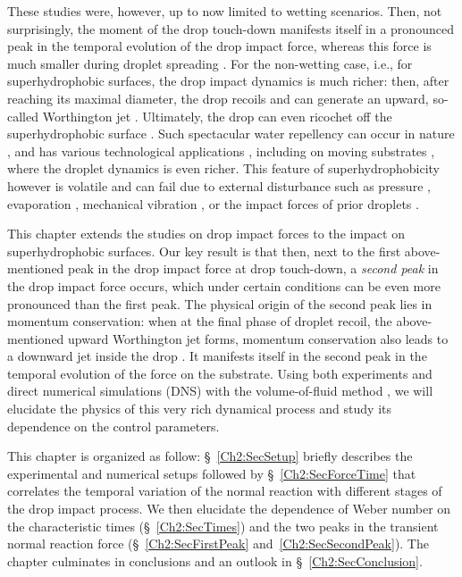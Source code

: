 These studies were, however, up to now limited to wetting scenarios. Then, not surprisingly, the moment of the drop touch-down \cite{wagner1932stoss, philippi2016} manifests itself in a pronounced peak in the temporal evolution of the drop impact force, whereas this force is much smaller during droplet spreading \cite{yarin2006drop, wildeman2016spreading}. For the non-wetting case, i.e., for superhydrophobic surfaces, the drop impact dynamics is much richer: then, after reaching its maximal diameter, the drop recoils \cite{bergeron2001water} and can generate an upward, so-called  Worthington jet \cite{worthington1877xxviii, bartolo2006singular}. Ultimately, the drop can even ricochet off the superhydrophobic surface \cite{richard2002contact}. Such spectacular water repellency can occur  in nature \cite{onda1996super, lafuma2003, callies2005water}, and has various technological applications \cite{tuteja2007, cho2016, liu2017, hao2016, wu2020}, including on moving substrates \cite{zhan2021}, where the droplet dynamics is even richer. This feature of superhydrophobicity however is volatile and can fail due to external disturbance such as pressure \cite{lafuma2003, callies2005water, sbragaglia2007, li2017}, evaporation \cite{tsai2010, chen2012, papadopoulos2013},  mechanical vibration \cite{bormashenko2007}, or the impact forces of prior droplets \cite{bartolo2006bouncing}.   

This chapter extends the studies on drop impact forces to the impact on superhydrophobic surfaces. Our key result is that then, next to the first above-mentioned peak in the drop impact force at drop touch-down, a {\it second peak}  in the drop impact force occurs, which under certain conditions can be even more pronounced than the first peak. The physical origin of the second peak lies in momentum conservation: when at the final phase of droplet recoil, the above-mentioned upward Worthington jet forms, momentum conservation also leads to a downward jet inside the drop \cite{lohse2004impact, lohse2018, lee2020downward, mitra2021bouncing}. It manifests itself in the second peak in the temporal evolution of the force on the substrate. Using both experiments and direct numerical simulations (DNS) with the volume-of-fluid method  \cite{basiliskpopinet1}, we will elucidate the physics of this very rich dynamical process and study its dependence on the control parameters.  

This chapter is organized as follow: \S~\ref{Ch2:SecSetup} briefly describes the experimental and numerical setups followed by \S~\ref{Ch2:SecForceTime} that correlates the temporal variation of the normal reaction with different stages of the drop impact process. We then elucidate the dependence of Weber number on the characteristic times (\S~\ref{Ch2:SecTimes}) and the two peaks in the transient normal reaction force (\S~\ref{Ch2:SecFirstPeak} and~\ref{Ch2:SecSecondPeak}). The chapter culminates in conclusions and an outlook in \S~\ref{Ch2:SecConclusion}.


